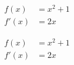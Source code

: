 \documentclass{article}
\begin{document}
\fontsize{30}{40}
\selectfont

\[\begin{aligned}
	f(x) & = x^{2} + 1 \\
	f\prime(x) & = 2x
\end{aligned}\]

\[\begin{aligned}
	f(x) & = x^{2} + 1 \\
	f\prime(x) & = 2x
\end{aligned}\]
\end{document}
